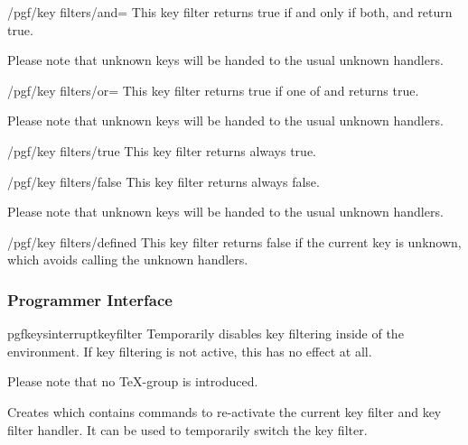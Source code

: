 \begin{key}{/pgf/key filters/and=}
	This key filter returns true if and only if both,  and  return true.

	Please note that unknown keys will be handed to the usual unknown handlers.
\end{key}

\begin{key}{/pgf/key filters/or=}
	This key filter returns true if one of  and  returns true.

	Please note that unknown keys will be handed to the usual unknown handlers.
\end{key}

\begin{key}{/pgf/key filters/true}
	This key filter returns always true.
\end{key}

\begin{key}{/pgf/key filters/false}
	This key filter returns always false.

	Please note that unknown keys will be handed to the usual unknown handlers.
\end{key}

\begin{key}{/pgf/key filters/defined}
	This key filter returns false if the current key is unknown, which avoids calling the unknown handlers.
\end{key}

\subsubsection{Programmer Interface}
\label{section-key-filter-api}%
\begin{plainenvironment}{{pgfkeysinterruptkeyfilter}}%
	Temporarily disables key filtering inside of the environment. If key filtering is not active, this has no effect at all.

	Please note that no \TeX-group is introduced.
\end{plainenvironment}

\begin{command}{\pgfkeyssavekeyfilterstateto{}}
Creates  which contains commands to re-activate the current
key filter and key filter handler. It can be used to temporarily
switch the key filter.
\end{command}

